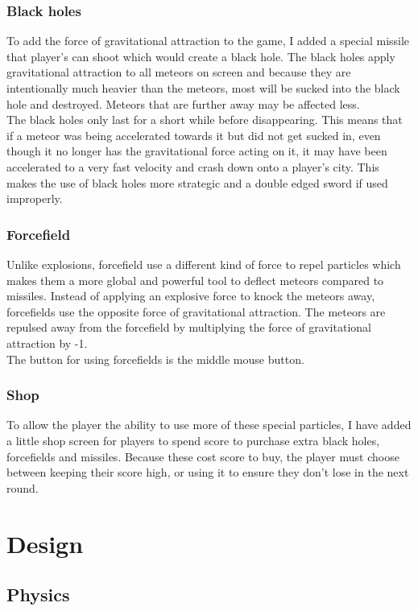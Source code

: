 \documentclass{article}
\newcommand{\n}[0]{\\[\baselineskip]}
\begin{document}
\subsubsection*{Black holes}
To add the force of gravitational attraction to the game, I added a special missile that player's can shoot which would create a black hole. The black holes apply gravitational attraction to all meteors on screen and because they are intentionally much heavier than the meteors, most will be sucked into the black hole and destroyed. Meteors that are further away may be affected less.
\n
The black holes only last for a short while before disappearing. This means that if a meteor was being accelerated towards it but did not get sucked in, even though it no longer has the gravitational force acting on it, it may have been accelerated to a very fast velocity and crash down onto a player's city. This makes the use of black holes more strategic and a double edged sword if used improperly. 
\subsubsection*{Forcefield}
Unlike explosions, forcefield use a different kind of force to repel particles which makes them a more global and powerful tool to deflect meteors compared to missiles. Instead of applying an explosive force to knock the meteors away, forcefields use the opposite force of gravitational attraction. The meteors are repulsed away from the forcefield by multiplying the force of gravitational attraction by -1. 
\n
The button for using forcefields is the middle mouse button.



\subsubsection*{Shop}
To allow the player the ability to use more of these special particles, I have added a little shop screen for players to spend score to purchase extra black holes, forcefields and missiles. Because these cost score to buy, the player must choose between keeping their score high, or using it to ensure they don't lose in the next round. 


\section{Design}


\subsection{Physics}
\end{document}

